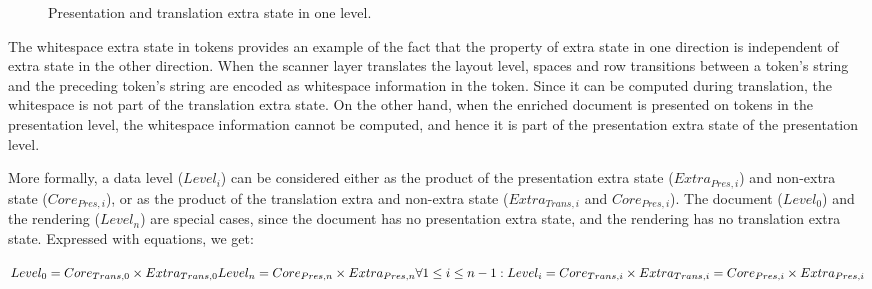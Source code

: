 \begin{figure}
\begin{center}
\begin{center}
\end{center}
\caption{Presentation and translation extra state in one level.}\label{levelExtraState} 
\end{center}
\end{figure}

The whitespace extra state in tokens provides an example of the fact that the property of extra state in one direction is independent of extra state in the other direction. When the scanner layer translates the layout level, spaces and row transitions between a token's string and the preceding token's string are encoded as whitespace information in the token. Since it can be computed during translation, the whitespace is not part of the translation extra state. On the other hand, when the enriched document is presented on tokens in the presentation level, the whitespace information cannot be computed, and hence it is part of the presentation extra state of the presentation level.
 


More formally, a data level ($Level_{i}$) can be considered either as the product of the presentation extra state ($Extra_{Pres,i}$) and non-extra state ($Core_{Pres,i}$), or as the product of the translation extra and non-extra state ($Extra_{Trans,i}$ and $Core_{Pres,i}$). The document ($Level_0$) and the rendering ($Level_n$) are special cases, since the document has no presentation extra state, and the rendering has no translation extra state. Expressed with equations, we get:

\begin{small}
\begin{math}
Level_{0} = Core_{Trans,0} \times Extra_{Trans,0}\\
Level_{n} = Core_{Pres,n} \times Extra_{Pres,n}\\
\forall 1 \le i \le n-1:  \\
Level_{i} = Core_{Trans,i} \times Extra_{Trans,i} = Core_{Pres,i} \times Extra_{Pres,i} 
\end{math}\end{small}

